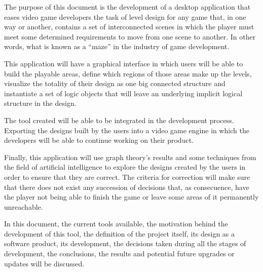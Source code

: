 The purpose of this document is the development of a desktop application that eases video game developers the task of level design for any game that, in one way or another, contains a set of interconnected scenes in which the player must meet some determined requirements to move from one scene to another. In other words, what is known as a ``maze'' in the industry of game development.

This application will have a graphical interface in which users will be able to build the playable areas, define which regions of those areas make up the levels, visualize the totality of their design as one big connected structure and instantiate a set of logic objects that will leave an underlying implicit logical structure in the design.

The tool created will be able to be integrated in the development process. Exporting the designs built by the users into a video game engine in which the developers will be able to continue working on their product.

Finally, this application will use graph theory's results and some techniques from the field of artificial intelligence to explore the designs created by the users in order to ensure that they are correct. The criteria for correction will make sure that there does not exist any succession of decisions that, as consecuence, have the player not being able to finish the game or leave some areas of it permanently unreachable.

In this document, the current tools available, the motivation behind the development of this tool, the definition of the project itself, its design as a software product, its development, the decisions taken during all the stages of development, the conclusions, the results and potential future upgrades or updates will be discussed.


